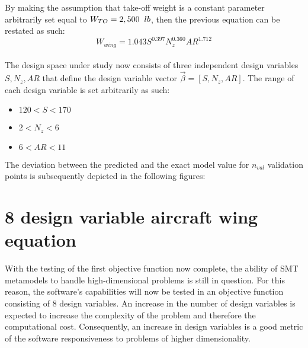 \begin{table}[h!]
\centering
{}
\caption{Design values for VUT100-131i Cobra}
\end{table}

\newpage


By making the assumption that take-off weight is a
constant parameter arbitrarily set equal to $W_{TO} = 
2,500 \hspace{2mm} lb$, then the previous equation can be 
restated as such:
\begin{equation}\label{pseudo_aircraft}
W_{wing} = 1.043S^{0.397}N_{z}^{0.360}
AR^{1.712}
\end{equation}
\\[-0.3cm]
The design space under study now consists of three 
independent design variables ${S,N_{z},AR}$ that define 
the design variable vector $\vec{β} = [S,N_{z},AR]$. 
The range of each design variable is set arbitrarily as 
such:
\begin{itemize}
\itemsep0em 
\item  $120 < S < 170$
\item $2 < N_{z} < 6$
\item $6 < AR < 11$
\end{itemize}
 
The deviation between the predicted and the exact model 
value for $n_{val}$ validation points is 
subsequently depicted in the following figures: 
 
\newpage


\section{8 design variable aircraft wing equation}
With the testing of the first objective function now
complete, the ability of SMT metamodels to handle high-dimensional 
problems is still in question. For this reason, the software's 
capabilities will now be tested in an objective function consisting 
of 8 design variables. An increase in the number of design 
variables is expected to increase the complexity of the problem and 
therefore the computational cost. Consequently, an increase in 
design variables is a good metric of the software responsiveness to 
problems of higher dimensionality.   

